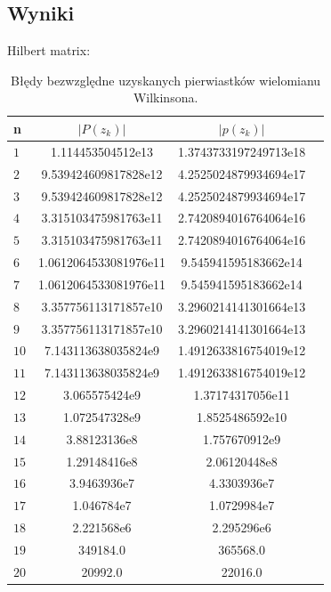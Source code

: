 \documentclass{classrep}
\begin{document}
	\subsection{Wyniki}
		Hilbert matrix:
		\begin{table}[!h]
        	\centering
        	\footnotesize
			\begin{tabular}{l|S|S|S} \toprule
				{n} & {$|P(z_k)|$} & {$|p(z_k)|$}\\ \midrule
				$1$ & 1.114453504512e13 & 1.3743733197249713e18 \\ 
	 			$2$ & 9.539424609817828e12 & 4.2525024879934694e17 \\
	 			$3$ & 9.539424609817828e12 & 4.2525024879934694e17 \\
	 			$4$ & 3.315103475981763e11 & 2.7420894016764064e16 \\
	 			$5$ & 3.315103475981763e11 & 2.7420894016764064e16 \\ 
	 			$6$ & 1.0612064533081976e11 & 9.545941595183662e14 \\
	 			$7$ & 1.0612064533081976e11 & 9.545941595183662e14 \\
	 			$8$ & 3.357756113171857e10 & 3.2960214141301664e13 \\ 
	 			$9$ & 3.357756113171857e10 & 3.2960214141301664e13 \\
	 			$10$ & 7.143113638035824e9 & 1.4912633816754019e12 \\
	 			$11$ & 7.143113638035824e9 & 1.4912633816754019e12 \\ 
	 			$12$ & 3.065575424e9 & 1.37174317056e11 \\
	 			$13$ & 1.072547328e9 & 1.8525486592e10 \\ 
	 			$14$ & 3.88123136e8 & 1.757670912e9 \\
	 			$15$ & 1.29148416e8 & 2.06120448e8 \\
	 			$16$ & 3.9463936e7 & 4.3303936e7 \\ 
	 			$17$ & 1.046784e7 & 1.0729984e7 \\
	 			$18$ & 2.221568e6 & 2.295296e6 \\ 
	 			$19$ & 349184.0 & 365568.0 \\
	 			$20$ & 20992.0 & 22016.0 \\ \bottomrule
	 		\end{tabular}
	 		\caption{Błędy bezwzględne uzyskanych pierwiastków wielomianu Wilkinsona.}
			\label{table:2}
		\end{table}	
\end{document}
